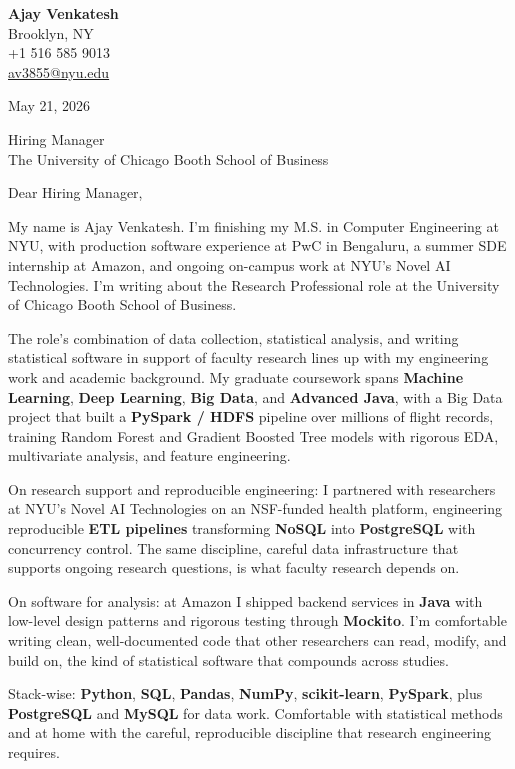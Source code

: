\documentclass[letterpaper,11pt]{article}
\begin{document}
\begin{flushleft}
\textbf{\large Ajay Venkatesh} \\
Brooklyn, NY \\
+1 516 585 9013 \\
\href{mailto:av3855@nyu.edu}{av3855@nyu.edu}
\end{flushleft}
\vspace{10pt}
May 21, 2026
\vspace{6pt}

Hiring Manager \\
The University of Chicago Booth School of Business

\vspace{10pt}

Dear Hiring Manager,

My name is Ajay Venkatesh. I'm finishing my M.S. in Computer Engineering at NYU, with production software experience at PwC in Bengaluru, a summer SDE internship at Amazon, and ongoing on-campus work at NYU's Novel AI Technologies. I'm writing about the Research Professional role at the University of Chicago Booth School of Business.

The role's combination of data collection, statistical analysis, and writing statistical software in support of faculty research lines up with my engineering work and academic background. My graduate coursework spans \textbf{Machine Learning}, \textbf{Deep Learning}, \textbf{Big Data}, and \textbf{Advanced Java}, with a Big Data project that built a \textbf{PySpark / HDFS} pipeline over millions of flight records, training Random Forest and Gradient Boosted Tree models with rigorous EDA, multivariate analysis, and feature engineering.

On research support and reproducible engineering: I partnered with researchers at NYU's Novel AI Technologies on an NSF-funded health platform, engineering reproducible \textbf{ETL pipelines} transforming \textbf{NoSQL} into \textbf{PostgreSQL} with concurrency control. The same discipline, careful data infrastructure that supports ongoing research questions, is what faculty research depends on.

On software for analysis: at Amazon I shipped backend services in \textbf{Java} with low-level design patterns and rigorous testing through \textbf{Mockito}. I'm comfortable writing clean, well-documented code that other researchers can read, modify, and build on, the kind of statistical software that compounds across studies.

Stack-wise: \textbf{Python}, \textbf{SQL}, \textbf{Pandas}, \textbf{NumPy}, \textbf{scikit-learn}, \textbf{PySpark}, plus \textbf{PostgreSQL} and \textbf{MySQL} for data work. Comfortable with statistical methods and at home with the careful, reproducible discipline that research engineering requires.
\end{document}
